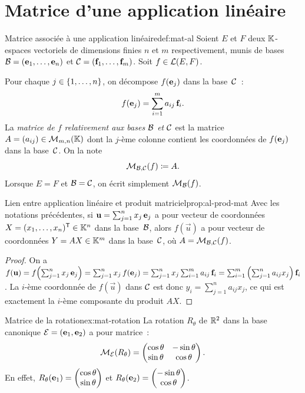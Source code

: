 \section{Matrice d'une application linéaire}\label{sec:matrice-al}

\begin{definition}{Matrice associée à une application linéaire}{def:mat-al}
  Soient $E$ et $F$ deux ${\mathbb{K}}$-espaces vectoriels de dimensions finies
  $n$ et $m$ respectivement, munis de bases
  ${\mathcal{B}}=(\mathbf{e}_{1},\ldots,\mathbf{e}_{n})$ et ${\mathcal{C}}=(\mathbf{f}_{1},\ldots,\mathbf{f}_{m})$.
  Soit $f\in{\mathcal{L}}(E,F)$.

  Pour chaque $j\in\left\{1,\ldots,n\right\}$, on décompose $f(\mathbf{e}_{j})$ dans la
  base~${\mathcal{C}}$~:
  \[
    f(\mathbf{e}_{j})=\sum_{i=1}^{m}a_{ij}\,\mathbf{f}_{i}.
  \]
  La \emph{matrice de $f$ relativement aux bases ${\mathcal{B}}$ et ${\mathcal{C}}$}%
   est la matrice
  $A=(a_{ij})\in\mathcal{M}_{m,n}({\mathbb{K}})$ dont la $j$-ème colonne contient les
  coordonnées de $f(\mathbf{e}_{j})$ dans la base~${\mathcal{C}}$. On la note
  \[
    \mathcal{M}_{{\mathcal{B}},{\mathcal{C}}}(f)\coloneqq A.
  \]
  Lorsque $E=F$ et ${\mathcal{B}}={\mathcal{C}}$, on écrit simplement $\mathcal{M}_{\mathcal{B}}(f)$.
\end{definition}

\begin{proposition}{Lien entre application linéaire et produit matriciel}{prop:al-prod-mat}
  Avec les notations précédentes, si $\mathbf{u}=\sum_{j=1}^n x_j\,\mathbf{e}_{j}$
  a pour vecteur de coordonnées $X=(x_1,\ldots,x_n)^{\mathsf{T}}\in{\mathbb{K}}^n$
  dans la base~${\mathcal{B}}$, alors $f(\vec{u})$ a pour vecteur de coordonnées
  $Y=AX\in{\mathbb{K}}^m$ dans la base~${\mathcal{C}}$, où $A=\mathcal{M}_{{\mathcal{B}},{\mathcal{C}}}(f)$.
\end{proposition}

\begin{proof}
  On a $f(\mathbf{u})=f\!\left(\sum_{j=1}^n x_j\,\mathbf{e}_{j}\right)
  =\sum_{j=1}^n x_j\,f(\mathbf{e}_{j})
  =\sum_{j=1}^n x_j\sum_{i=1}^m a_{ij}\,\mathbf{f}_{i}
  =\sum_{i=1}^m\left(\sum_{j=1}^n a_{ij}x_j\right)\mathbf{f}_{i}$.
  La $i$-ème coordonnée de $f(\vec{u})$ dans ${\mathcal{C}}$ est donc
  $y_i=\sum_{j=1}^n a_{ij}x_j$, ce qui est exactement la $i$-ème
  composante du produit $AX$.
\end{proof}

\begin{example}{Matrice de la rotation}{ex:mat-rotation}
  La rotation $R_\theta$ de ${\mathbb{R}}^2$ dans la base canonique
  ${\mathcal{E}}=(\mathbf{e}_{1},\mathbf{e}_{2})$ a pour matrice~:
  \[
    \mathcal{M}_{\mathcal{E}}(R_\theta)=\begin{pmatrix}
      \cos\theta & -\sin\theta \\ \sin\theta & \cos\theta
    \end{pmatrix}.
  \]
  En effet, $R_\theta(\mathbf{e}_{1})=\begin{pmatrix}\cos\theta\\\sin\theta\end{pmatrix}$
  et $R_\theta(\mathbf{e}_{2})=\begin{pmatrix}-\sin\theta\\\cos\theta\end{pmatrix}$.
\end{example}

